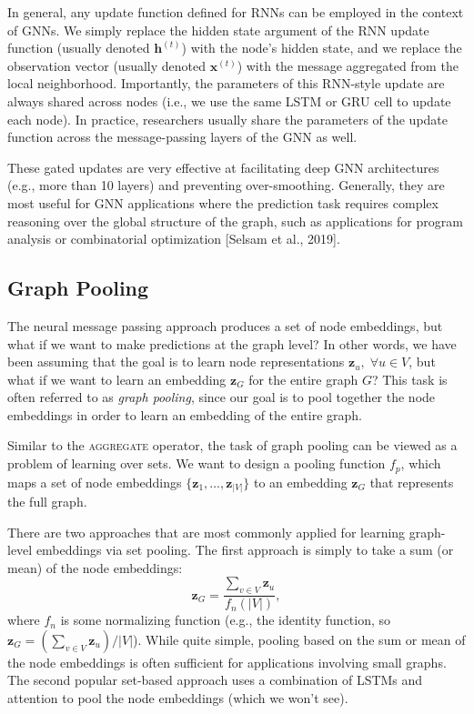 \documentclass[10pt]{book}
\let\defaultmarginpar\marginpar
\renewcommand\marginpar[2][]{\defaultmarginpar{\itshape\color{gray}#2}}
\begin{document}
In general, any update function defined for RNNs can be employed in the context of GNNs. We simply replace the hidden state argument of the RNN update function (usually denoted $\mathbf h^{(t)}$) with the node's hidden state, and we replace the observation vector (usually denoted $\mathbf x^{(t)}$) with the message aggregated from the local neighborhood. Importantly, the parameters of this RNN-style update are always shared across nodes (i.e., we use the same LSTM or GRU cell to update each node). In practice, researchers usually share the parameters of the update function across the message-passing layers of the GNN as well.

These gated updates are very effective at facilitating deep GNN architectures (e.g., more than 10 layers) and preventing over-smoothing. Generally, they are most useful for GNN applications where the prediction task requires complex reasoning over the global structure of the graph, such as applications for program analysis or combinatorial optimization [Selsam et al., 2019].

\subsection{Graph Pooling}

The neural message passing approach produces a set of node embeddings, but what if we want to make predictions at the graph level? In other words, we have been assuming that the goal is to learn node representations $\mathbf z_u, \; \forall u \in V$, but what if we want to learn an embedding $\mathbf z_G$ for the entire graph $G$? This task is often referred to as \emph{graph pooling}\marginpar{graph pooling}, since our goal is to pool together the node embeddings in order to learn an embedding of the entire graph.

Similar to the \textsc{aggregate} operator, the task of graph pooling can be viewed as a problem of learning over sets. We want to design a pooling function $f_p$, which maps a set of node embeddings $\{\mathbf z_1, \ldots, \mathbf z_{|V|} \}$ to an embedding $\mathbf z_G$ that represents the full graph.

There are two approaches that are most commonly applied for learning graph-level embeddings via set pooling. The first approach is simply to take a sum (or mean) of the node embeddings:
\begin{equation}
    \mathbf z_G = \frac{\sum_{v \in V} \mathbf z_u}{f_n(|V|)},
\end{equation}
where $f_n$ is some normalizing function (e.g., the identity function, so $\mathbf z_G = (\sum_{v \in V} \mathbf z_u)/|V|$). While quite simple, pooling based on the sum or mean of the node embeddings is often sufficient for applications involving small graphs. The second popular set-based approach uses a combination of LSTMs and attention to pool the node embeddings (which we won't see).
\end{document}
